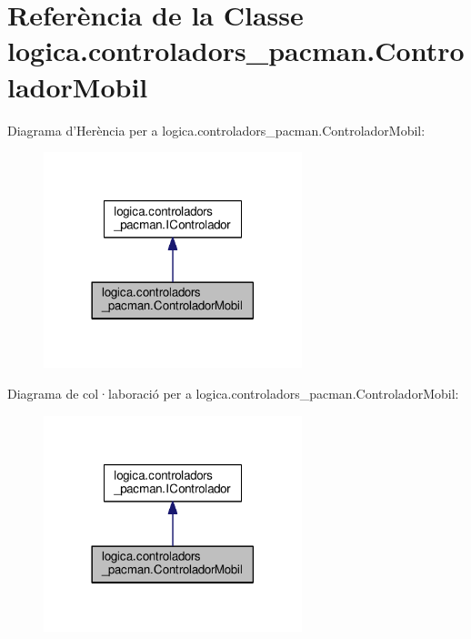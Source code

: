 \hypertarget{classlogica_1_1controladors__pacman_1_1_controlador_mobil}{\section{Referència de la Classe logica.\+controladors\+\_\+pacman.\+Controlador\+Mobil}
\label{classlogica_1_1controladors__pacman_1_1_controlador_mobil}
}


Diagrama d'Herència per a logica.\+controladors\+\_\+pacman.\+Controlador\+Mobil\+:\nopagebreak
\begin{figure}[H]
\begin{center}
\leavevmode
\includegraphics[width=213pt]{classlogica_1_1controladors__pacman_1_1_controlador_mobil__inherit__graph}
\end{center}
\end{figure}


Diagrama de col·laboració per a logica.\+controladors\+\_\+pacman.\+Controlador\+Mobil\+:\nopagebreak
\begin{figure}[H]
\begin{center}
\leavevmode
\includegraphics[width=213pt]{classlogica_1_1controladors__pacman_1_1_controlador_mobil__coll__graph}
\end{center}
\end{figure}
